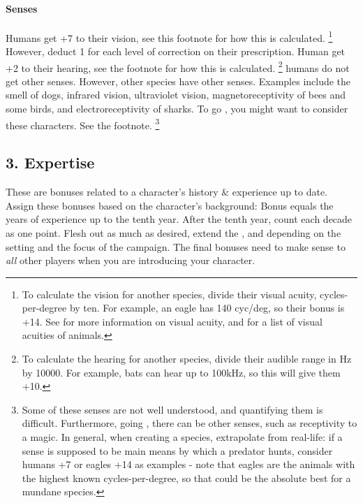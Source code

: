 \documentclass{LegrandOrangeTufteBook}
\begin{document}
\paragraph*{Senses}
Humans get +7 to their vision, see this footnote for how this is calculated.
\footnote{
	To calculate the vision for another species, divide their visual acuity, cycles-per-degree by ten.
	For example, an eagle has 140 cyc/deg, so their bonus is +14.
	See \cite{caves_acuityview_2018} for more information on visual acuity,
	and \cite{noauthor_list_2019} for a list of visual acuities of animals.
}
However, deduct 1 for each level of correction on their prescription.
Human get +2 to their hearing, see the footnote for how this is calculated.
\footnote{
	To calculate the hearing for another species, divide their audible range in Hz by 10000.
	For example, bats can hear up to 100kHz, so this will give them +10.
}
 humans do not get other senses.
However, other species have other senses.
Examples include the smell of dogs, infrared vision, ultraviolet vision,
magnetoreceptivity of bees and some birds, and electroreceptivity of sharks.
To go , you might want to consider these characters.
See the footnote.
\footnote{
	Some of these senses are not well understood, and quantifying them is difficult.
	Furthermore, going , there can be other senses,
	such as receptivity to a magic.
	In general, when creating a species, extrapolate from real-life:
	if a sense is supposed to be main means by which a predator
	hunts, consider humans +7 or eagles +14 as examples - note that eagles
	are the animals with the highest known cycles-per-degree, so that
	could be the absolute best for a mundane species.
}




\subsection*{3. Expertise}

These are bonuses related to a character's history \& experience up to date.
Assign these bonuses based on the character's background:
Bonus equals the years of experience up to the tenth year.
After the tenth year, count each decade as one point.
Flesh out as much as desired, extend the ,  and  depending on the setting and the focus of the campaign.
The final bonuses need to make sense to \emph{all} other players when you are introducing your character.\\
\end{document}
